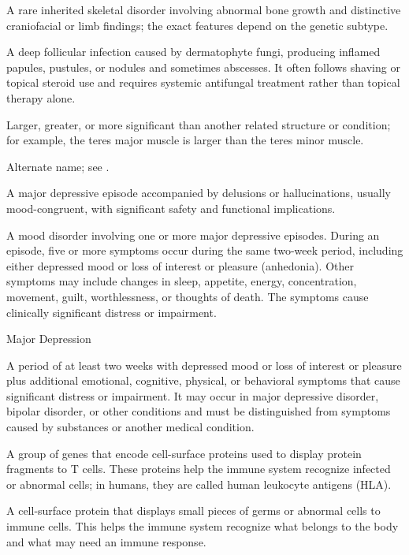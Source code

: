  A rare inherited skeletal disorder involving abnormal bone growth and distinctive craniofacial or limb findings; the exact features depend on the genetic subtype.

 A deep follicular infection caused by dermatophyte fungi, producing inflamed papules, pustules, or nodules and sometimes abscesses. It often follows shaving or topical steroid use and requires systemic antifungal treatment rather than topical therapy alone.

 Larger, greater, or more significant than another related structure or condition; for example, the teres major muscle is larger than the teres minor muscle.

 Alternate name; see .

 A major depressive episode accompanied by delusions or hallucinations, usually mood-congruent, with significant safety and functional implications.

 A mood disorder involving one or more major depressive episodes. During an episode, five or more symptoms occur during the same two-week period, including either depressed mood or loss of interest or pleasure (anhedonia). Other symptoms may include changes in sleep, appetite, energy, concentration, movement, guilt, worthlessness, or thoughts of death. The symptoms cause clinically significant distress or impairment.

\synonyms
Major Depression

 A period of at least two weeks with depressed mood or loss of interest or pleasure plus additional emotional, cognitive, physical, or behavioral symptoms that cause significant distress or impairment. It may occur in major depressive disorder, bipolar disorder, or other conditions and must be distinguished from symptoms caused by substances or another medical condition.

 A group of genes that encode cell-surface proteins used to display protein fragments to T cells. These proteins help the immune system recognize infected or abnormal cells; in humans, they are called human leukocyte antigens (HLA).

 A cell-surface protein that displays small pieces of germs or abnormal cells to immune cells. This helps the immune system recognize what belongs to the body and what may need an immune response.

